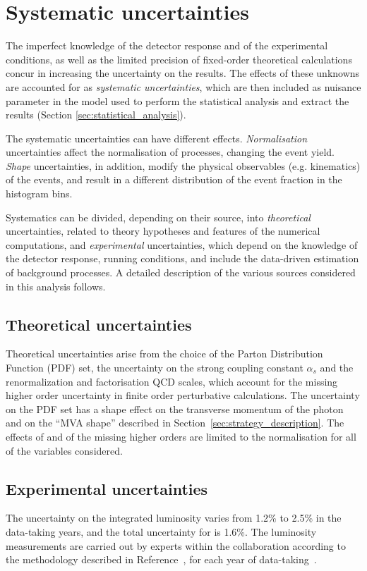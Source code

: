 \section{Systematic uncertainties}
\label{sec:systematics}
The imperfect knowledge of the detector response and of the experimental conditions, as well as the limited precision of fixed-order theoretical calculations concur in increasing the uncertainty on the results.
The effects of these unknowns are accounted for as \textit{systematic uncertainties}, which are then included as nuisance parameter in the model used to perform the statistical analysis and extract the results (Section \ref{sec:statistical_analysis}).

The systematic uncertainties can have different effects.
\textit{Normalisation} uncertainties affect the normalisation of processes, changing the event yield.
\textit{Shape} uncertainties, in addition, modify the physical observables (e.g. kinematics) of the events, and result in a different distribution of the event fraction in the histogram bins.

Systematics can be divided, depending on their source, into \textit{theoretical} uncertainties, related to theory hypotheses and features of the numerical computations, and \textit{experimental} uncertainties, which depend on the knowledge of the detector response, running conditions, and include the data-driven estimation of background processes.
A detailed description of the various sources considered in this analysis follows.

\subsection{Theoretical uncertainties}
Theoretical uncertainties arise from the choice of the Parton Distribution Function (PDF) set,
the uncertainty on the strong coupling constant $\alpha_s$ and
the renormalization and factorisation QCD scales, which account for the missing higher order uncertainty in finite order perturbative calculations.
The uncertainty on the PDF set has a shape effect on the transverse momentum of the photon
and on the ``MVA shape'' described in Section~\ref{sec:strategy_description}.
The effects of \alpS and of the missing higher orders are limited to the normalisation for all of the variables considered.

\subsection{Experimental uncertainties}
The uncertainty on the integrated luminosity varies from 1.2\usep\% to 2.5\usep\% in the data-taking years, and the total uncertainty for \RunII{} is 1.6\usep\%.
The luminosity measurements are carried out by experts within the collaboration according to the methodology described in Reference~\cite{CMS:LUM-17-003},
for each year of data-taking~\cite{CMS:LUM-17-004, CMS:LUM-18-002}.

